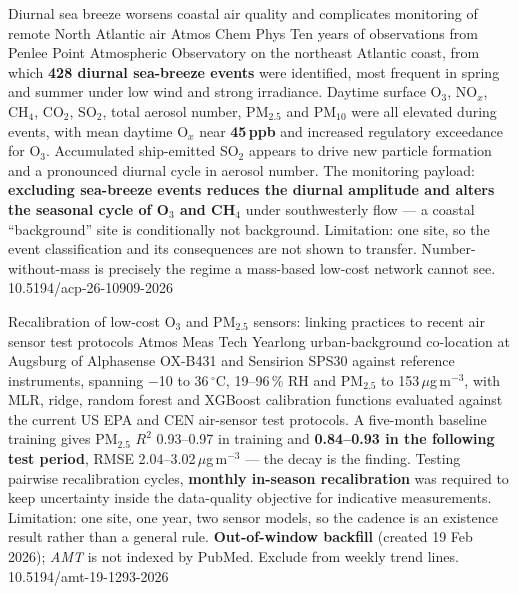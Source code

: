 \documentclass[10pt]{article}
\begin{document}
{Diurnal sea breeze worsens coastal air quality and complicates monitoring of remote
North Atlantic air}
{Atmos Chem Phys}
{Ten years of observations from Penlee Point Atmospheric Observatory on the northeast
Atlantic coast, from which \textbf{428 diurnal sea-breeze events} were identified, most
frequent in spring and summer under low wind and strong irradiance. Daytime surface
O$_3$, NO$_x$, CH$_4$, CO$_2$, SO$_2$, total aerosol number, PM$_{2.5}$ and PM$_{10}$ were
all elevated during events, with mean daytime O$_x$ near \textbf{45\,ppb} and increased
regulatory exceedance for O$_3$. Accumulated ship-emitted SO$_2$ appears to drive new
particle formation and a pronounced diurnal cycle in aerosol number. The monitoring
payload: \textbf{excluding sea-breeze events reduces the diurnal amplitude and alters the
seasonal cycle of O$_3$ and CH$_4$} under southwesterly flow --- a coastal ``background''
site is conditionally not background. Limitation: one site, so the event classification
and its consequences are not shown to transfer. Number-without-mass is precisely the
regime a mass-based low-cost network cannot see.}
{10.5194/acp-26-10909-2026}

{Recalibration of low-cost O$_3$ and PM$_{2.5}$ sensors: linking practices to recent air
sensor test protocols}
{Atmos Meas Tech}
{Yearlong urban-background co-location at Augsburg of Alphasense OX-B431 and Sensirion
SPS30 against reference instruments, spanning $-$10 to 36\,$^{\circ}$C, 19--96\,\% RH and
PM$_{2.5}$ to 153\,$\mu$g\,m$^{-3}$, with MLR, ridge, random forest and XGBoost
calibration functions evaluated against the current US EPA and CEN air-sensor test
protocols. A five-month baseline training gives PM$_{2.5}$ $R^2$ 0.93--0.97 in training
and \textbf{0.84--0.93 in the following test period}, RMSE 2.04--3.02\,$\mu$g\,m$^{-3}$
--- the decay is the finding. Testing pairwise recalibration cycles, \textbf{monthly
in-season recalibration} was required to keep uncertainty inside the data-quality
objective for indicative measurements. Limitation: one site, one year, two sensor models,
so the cadence is an existence result rather than a general rule. \textbf{Out-of-window
backfill} (created 19 Feb 2026); \textit{AMT} is not indexed by PubMed. Exclude from
weekly trend lines.}
{10.5194/amt-19-1293-2026}
\end{document}
